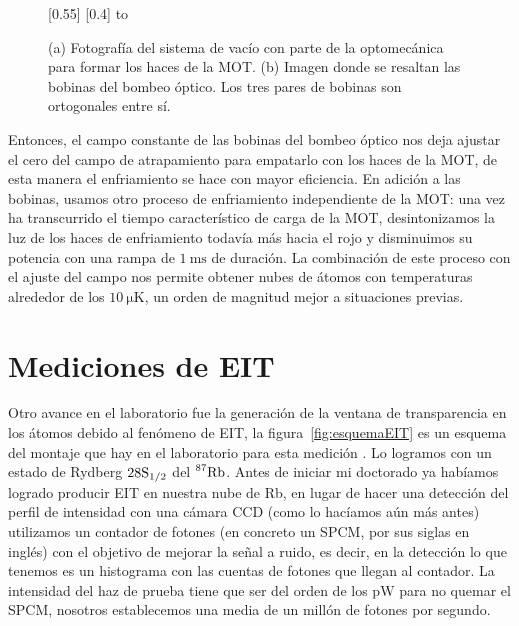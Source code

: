 \newsavebox{\bobinasBox}
\begin{figure}[!ht]
\centering
\begin{minipage}{0.8\textwidth}
\centering
{}
\subcaptionbox{\label{fig:fotoExp}}[0.55\linewidth]{\usebox{\bobinasBox}}
\hfill
\subcaptionbox{\label{fig:bobinasBombeoOpticoDestacado}}[0.4\linewidth]{
\vbox to \ht{}}
\caption[Bobinas del Bombeo Óptico]{\label{fig:bobinasBombeoOptico}(a) Fotografía del sistema de vacío con parte de la optomecánica para formar los haces de la MOT. (b) Imagen donde se resaltan las bobinas del bombeo óptico. Los tres pares de bobinas son ortogonales entre sí.}
\end{minipage}
\end{figure}

Entonces, el campo constante de las bobinas del bombeo óptico nos deja ajustar el cero del campo de atrapamiento para empatarlo con los haces de la MOT, de esta manera el enfriamiento se hace con mayor eficiencia. En adición a las bobinas, usamos otro proceso de enfriamiento independiente de la MOT: una vez ha transcurrido el tiempo característico de carga de la MOT, desintonizamos la luz de los haces de enfriamiento todavía más hacia el rojo y disminuimos su potencia con una rampa de $\SI{1}{\milli\second}$ de duración. La combinación de este proceso con el ajuste del campo nos permite obtener nubes de átomos con temperaturas alrededor de los $\SI{10}{\micro\kelvin}$, un orden de magnitud mejor a situaciones previas.

\section{\label{sec:medicionesEIT}Mediciones de EIT}

Otro avance en el laboratorio fue la generación de la ventana de transparencia en los átomos debido al fenómeno de EIT, la figura~\ref{fig:esquemaEIT} es un esquema del montaje que hay en el laboratorio para esta medición . Lo logramos con un estado de Rydberg $28\mathrm{S}_{1/2}$ del $\prescript{87}{}{\mathrm{Rb}}$. Antes de iniciar mi doctorado ya habíamos logrado producir EIT en nuestra nube de Rb, en lugar de hacer una detección del perfil de intensidad con una cámara CCD (como lo hacíamos aún más antes) utilizamos un contador de fotones (en concreto un SPCM, por sus siglas en inglés) con el objetivo de mejorar la señal a ruido, es decir, en la detección lo que tenemos es un histograma con las cuentas de fotones que llegan al contador. La intensidad del haz de prueba tiene que ser del orden de los $\si{\pico\watt}$ para no quemar el SPCM, nosotros establecemos una media de un millón de fotones por segundo.

